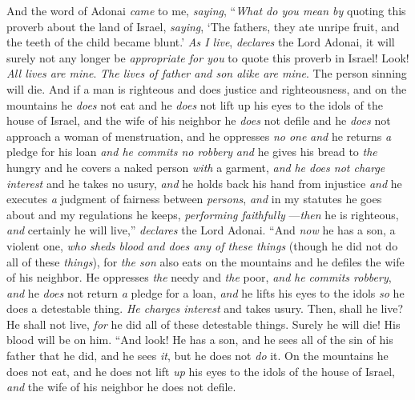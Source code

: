 \begin{biblechapter} %
 And the word of Adonai \textit{came} to me, \textit{saying},
\verse “\textit{What do you mean by} quoting this proverb about the land of Israel, \textit{saying}, ‘The fathers, they ate unripe fruit, and the teeth of the child became blunt.’
\verse \textit{As I live}, \textit{declares} the Lord Adonai, it will surely not any longer be \textit{appropriate for you} to quote this proverb in Israel!
\verse Look! \textit{All lives are mine}. \textit{The lives of father and son alike are mine}. The person sinning will die.
\verse And if a man is righteous and does justice and righteousness,
\verse and on the mountains he \textit{does} not eat and he \textit{does} not lift up his eyes to the idols of the house of Israel, and the wife of his neighbor he \textit{does} not defile and he \textit{does} not approach a woman of menstruation,
\verse and he oppresses \textit{no one} \textit{and} he returns \textit{a} pledge for his loan \textit{and he commits no robbery} \textit{and} he gives his bread to \textit{the} hungry and he covers a naked person \textit{with} a garment,
\verse \textit{and} \textit{he does not charge interest} and he takes no usury, \textit{and} he holds back his hand from injustice \textit{and} he executes \textit{a} judgment of fairness between \textit{persons},
\verse \textit{and} in my statutes he goes about and my regulations he keeps, \textit{performing faithfully} —\textit{then} he is righteous, \textit{and} certainly he will live,” \textit{declares} the Lord Adonai.
\verse “And \textit{now} he has a son, a violent one, \textit{who sheds blood} \textit{and does any of these things}
\verse (though he did not do all of these \textit{things}), for \textit{the son} also eats on the mountains and he defiles the wife of his neighbor.
\verse He oppresses \textit{the} needy and \textit{the} poor, \textit{and} \textit{he commits robbery}, \textit{and} he \textit{does} not return \textit{a} pledge for a loan, \textit{and} he lifts his eyes to the idols \textit{so} he does a detestable thing.
\verse \textit{He charges interest} and takes usury. Then, shall he live? He shall not live, \textit{for} he did all of these detestable things. Surely he will die! His blood will be on him.
\verse “And look! He has a son, and he sees all of the sin of his father that he did, and he sees \textit{it}, but he does not \textit{do} it.
\verse On the mountains he does not eat, and he does not lift \textit{up} his eyes to the idols of the house of Israel, \textit{and} the wife of his neighbor he does not defile.

\end{biblechapter}
